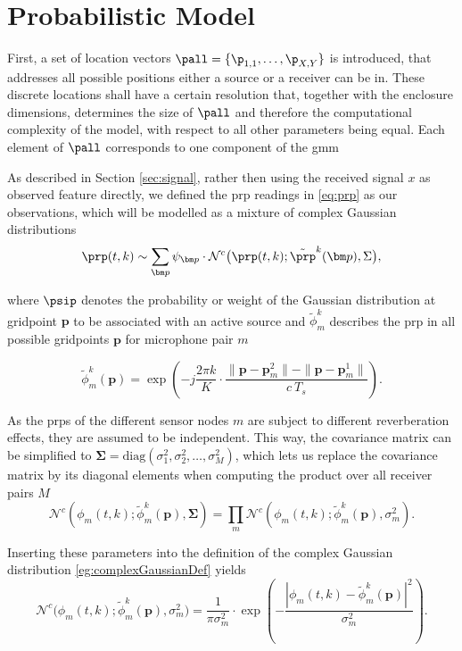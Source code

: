 \section{Probabilistic Model} \label{sec:prob_model}

First, a set of location vectors $\pall=\{\p_{1,1},\dots,\p_{X,Y}\}$ is introduced, that addresses all possible positions either a source or a receiver can be in. These discrete locations shall have a certain resolution that, together with the enclosure dimensions, determines the size of $\pall$ and therefore the computational complexity of the model, with respect to all other parameters being equal. Each element of $\pall$ corresponds to one component of the \gls{gmm}


As described in Section \ref{sec:signal}, rather then using the received signal $x$ as observed feature directly, we defined the \gls{prp} readings in \eqref{eq:prp} as our observations, which will be modelled as a mixture of complex Gaussian distributions
\begin{equation}
	\prp(t,k)\sim\sum_{\bm p}\psi_{\bm p}\cdot\mathcal{N}^c\big(\prp(t,k);\tilde\prp^k(\bm p),\Sigma\big),
\label{eq:phi_gmm}
\end{equation}

where $\psip$ denotes the probability or weight of the Gaussian distribution at gridpoint $\bm p$ to be associated with an active source and $\tilde\phi^k_m$ describes the \gls{prp} in all possible gridpoints $\bm p$ for microphone pair $m$

\begin{equation}
    \tilde\phi^k_m(\bm p)=\exp{\left (-j\frac{2\pi k}{K}\cdot\frac{\|\bm p-\bm p^2_m\|-\|\bm p-\bm p^1_m\|}{c\ T_s}\right )}.
\label{eq:phi_tilde}
\end{equation}

As the \glspl{prp} of the different sensor nodes $m$ are subject to different reverberation effects, they are assumed to be independent. This way, the covariance matrix can be simplified to $\bm\Sigma=\text{diag}(\sigma^2_{1}, \sigma^2_{2}, \dots, \sigma^2_{M})$, which lets us replace the covariance matrix by its diagonal elements when computing the product over all receiver pairs $M$
\begin{equation}
    \mathcal{N}^c(\phi_m(t,k);\tilde\phi^k_m(\bm p),\bm\Sigma)=\prod_m \mathcal{N}^c(\phi_m(t,k);\tilde\phi^k_m(\bm p),\sigma^2_m).
\end{equation}

Inserting these parameters into the definition of the complex Gaussian distribution \eqref{eg:complexGaussianDef} yields
\begin{equation}
    \mathcal{N}^c\big(\phi_m(t,k);\tilde\phi_m^k(\bm p),\sigma_{m}^2\big)=\frac{1}{\pi\sigma_{m}^2}\cdot\exp\left (-\frac{\left|\phi_m(t,k)-\tilde\phi_m^k(\bm p)\right|^2}{\sigma_{m}^2} \right ).
\label{eq:gaussian}
\end{equation}

